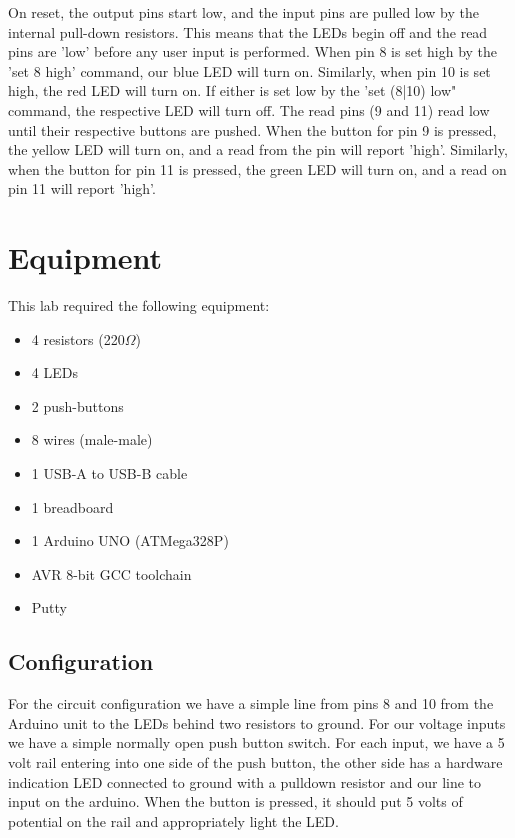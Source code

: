 \documentclass[letterpaper,11pt]{texMemo} %
\begin{document}
On reset, the output pins start low, and the input pins are pulled low by the internal pull-down resistors. This means that the LEDs begin off and the read pins are 'low' before any user input is performed. When pin 8 is set high by the 'set 8 high' command, our blue LED will turn on. Similarly, when pin 10 is set high, the red LED will turn on. If either is set low by the 'set (8|10) low" command, the respective LED will turn off. The read pins (9 and 11) read low until their respective buttons are pushed. When the button for pin 9 is pressed, the yellow LED will turn on, and a read from the pin will report 'high'. Similarly, when the button for pin 11 is pressed, the green LED will turn on, and a read on pin 11 will report 'high'.


\section*{Equipment}
This lab required the following equipment:
\begin{itemize}
\item 4 resistors (220$\Omega$)
\item 4 LEDs
\item 2 push-buttons
\item 8 wires (male-male)
\item 1 USB-A to USB-B cable
\item 1 breadboard
\item 1 Arduino UNO (ATMega328P)
\item AVR 8-bit GCC toolchain
\item Putty
\end{itemize}

\subsection*{Configuration}

For the circuit configuration we have a simple line from pins 8 and 10 from the Arduino unit to the LEDs behind two
resistors to ground. For our voltage inputs we have a simple normally open push button switch. For each input, we have
a 5 volt rail entering into one side of the push button, the other side has a hardware indication LED connected to
ground with a pulldown resistor and our line to input on the arduino. When the button is pressed, it should put 5
volts of potential on the rail and appropriately light the LED.
\end{document}
